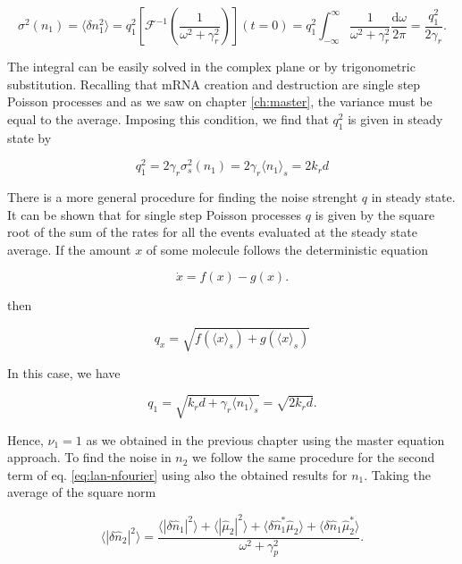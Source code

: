 \begin{equation}
  \label{eq:lan-qrel1}
  \sigma^2(n_1) = \langle\delta n_1^2\rangle = q_1^2 \left[\mathscr{F}^{-1}\left(\frac{1}{\omega^2+\gamma_r^2}\right)\right](t=0) = q_1^2\int_{-\infty}^\infty\frac{1}{\omega^2+\gamma_r^2}\frac{\mathrm{d}\omega}{2\pi} = \frac{q_1^2}{2\gamma_r}.
\end{equation}

The integral can be easily solved in the complex plane or by trigonometric substitution. Recalling that mRNA creation and destruction are single step Poisson processes and as we saw on chapter \ref{ch:master}, the variance must be equal to the average. Imposing this condition, we find that $q_1^2$ is given in steady state by

\begin{equation*}
  q_1^2 = 2\gamma_r\sigma_s^2(n_1) = 2\gamma_r\langle n_1\rangle_s = 2k_rd
\end{equation*}

There is a more general procedure for finding the noise strenght $q$ in steady state. It can be shown that for single step Poisson processes $q$ is given by the square root of the sum of the rates for all the events evaluated at the steady state average. If the amount $x$ of some molecule follows the deterministic equation

\begin{equation*}
  \dot{x} = f(x) - g(x).
\end{equation*}

then

\begin{equation}
  \label{eq:lan-q_form}
  q_x = \sqrt{f(\langle x\rangle_s)+g(\langle x\rangle_s)}
\end{equation}

In this case, we have

\begin{equation*}
  q_1 = \sqrt{k_rd + \gamma_r\langle n_1\rangle_s} = \sqrt{2k_rd}.
\end{equation*}

Hence, $\nu_1 = 1$ as we obtained in the previous chapter using the master equation approach. To find the noise in $n_2$ we follow the same procedure for the second term of eq. \eqref{eq:lan-nfourier} using also the obtained results for $n_1$. Taking the average of the square norm

\begin{equation*}
  \langle|\delta\hat{n}_2|^2\rangle = \frac{\langle|\delta\hat{n}_1|^2\rangle + \langle|\hat{\mu}_2|^2\rangle + \langle \delta\hat{n}_1^* \hat{\mu}_2\rangle +\langle \delta\hat{n}_1 \hat{\mu}_2^*\rangle}{\omega^2+\gamma_p^2}.
\end{equation*}
  
